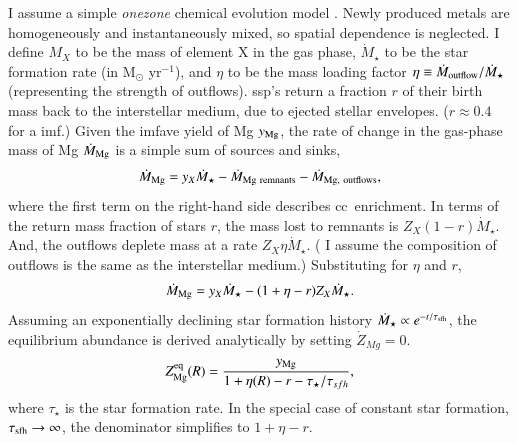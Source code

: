 \documentclass[12pt,oneside,letterpaper]{report}
\newcommand{\cc}{\gls{cc}}
\newcommand{\ssp}{\gls{ssp}}
\newcommand{\imf}{\gls{imf}}
\begin{document}
I assume a simple \textit{\gls{onezone}} chemical evolution model \cite[e.g.][]{tinsley80, pagel09, matteucci21}.  Newly produced metals are homogeneously and instantaneously mixed, so spatial dependence is neglected.
I define $M_{X}$ to be the mass of element X in the gas phase, $\dot{M}_\star$ to be the star formation rate (in M$_\odot$ yr$^{-1}$), and $\eta$ to be the mass loading factor $\eta\equiv\dot{M}_{\rm outflow}/\dot{M}_\star$ (representing the strength of outflows). \ssp's return a fraction $r$ of their birth mass back to the interstellar medium, due to ejected stellar envelopes. ($r\approx0.4$ for a \citealt{kroupa01} \imf.)
Given the \gls{imfave} yield of Mg $y_{\rm Mg}$, the rate of change in the gas-phase mass of Mg $\dot{M}_{\rm Mg}$ is a simple sum of sources and sinks,
\begin{equation}
    \dot{M}_{\rm Mg} =  y_{X}\dot{M}_\star - \dot{M}_{\rm Mg~remnants} - \dot{M}_{\rm Mg,~outflows},
\end{equation}
where the first term on the right-hand side describes \cc\ enrichment. 
In terms of the return mass fraction of stars $r$, the mass lost to remnants is $Z_X (1-r)\dot{M}_\star$.  And, the outflows deplete mass at a rate $Z_X \eta\dot{M}_\star$. ( I assume the composition of outflows is the same as the interstellar medium.) Substituting for $\eta$ and $r$,  
\begin{equation}
    \dot{M}_{\rm Mg}= y_{X} \dot{M}_\star - (1 + \eta - r) Z_{X} \dot{M}_\star.
\end{equation}
Assuming an exponentially declining star formation history $\dot{M}_\star \propto e^{-t/\tau_{\rm sfh}}$, the equilibrium abundance is derived analytically by setting $\dot{Z}_{Mg}=0$.
\begin{equation}\label{eq:z_eq}
    Z_{\rm Mg}^{\rm eq}(R) = \frac{y_{\rm Mg}}{1 + \eta(R) - r - \tau_\star / \tau_{sfh}},
\end{equation}
where $\tau_{\star}$ is the star formation rate.
In the special case of constant star formation, $\tau_{\rm sfh}\to\infty$, the denominator simplifies to $1+\eta-r$.
\end{document}
